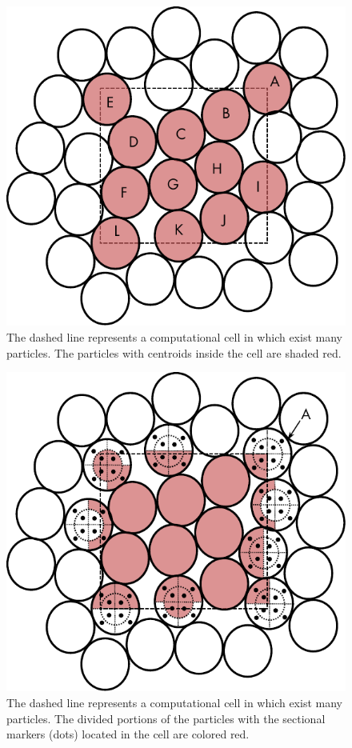 \begin{figure}[ht]
	\centering
	\includegraphics[width=\singleimagewidth]{figures/void-fraction-cell.pdf}
	\caption{The dashed line represents a computational cell in which exist many particles. The particles with centroids inside the cell are shaded red.}\label{fig:centroid-void-fraction}
\end{figure}

\begin{figure}[t]
	\centering
	\includegraphics[width=\singleimagewidth]{figures/void-fraction-divided-cell.pdf}
	\caption{The dashed line represents a computational cell in which exist many particles. The divided portions of the particles with the sectional markers (dots) located in the cell are colored red.}\label{fig:centroid-void-fraction-divided}
\end{figure}

